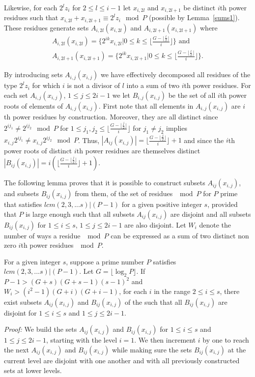 Likewise, for each $2^lz_i$ for $2 \leq l \leq i-1$ let $x_{i,2l}$
and $x_{i,2l+1}$ be distinct $i$th power residues such that
$x_{i,2l} + x_{i,2l+1} \equiv 2^lz_i \mod P$ (possible by
Lemma~\ref{sums1}). These residues generate sets
$A_{i,2l}(x_{i,2l})$ and  $A_{i,2l+1}(x_{i,2l+1})$ where
\begin{eqnarray}\label{azi2l}
A_{i,2l}(x_{i,2l}) =\{ 2^{ik}x_{i,2l}| 0 \leq k \leq \lfloor
\frac{G-\lfloor \frac{l}{2} \rfloor}{i} \rfloor \} \text{ and }\\
\label{azi2l}A_{i,2l+1}(x_{i,2l+1}) =\{ 2^{ik}x_{i,2l+1}| 0 \leq k
\leq \lfloor \frac{G-\lfloor \frac{l}{2} \rfloor}{i} \rfloor
\}.\end{eqnarray}

By introducing sets $A_{i,j}(x_{i,j})$ we have effectively
decomposed all residues of the type $2^lz_i$ for which $i$ is not
a divisor of $l$ into a sum of two $i$th power residues. For each
set $A_{i,j}(x_{i,j})$, $1 \leq j \leq 2i-1$ we let
$B_{i,j}(x_{i,j})$ be the set of all $i$th power roots of elements
of $A_{i,j}(x_{i,j})$. First note that all elements in
$A_{i,j}(x_{i,j})$ are $i$th power residues by construction.
Moreover, they are all distinct since  $2^{ij_1} \neq 2^{ij_2}
\mod P$ for $1 \leq j_1,j_2 \leq \lfloor
\frac{G-\lfloor\frac{j}{2} \rfloor}{i} \rfloor$ for $j_1\neq j_2$
implies $x_{i,j}2^{ij_1} \neq x_{i,j}2^{ij_2} \mod P$. Thus,
$|A_{ij}(x_{i,j})|=\lfloor \frac{G-\lfloor \frac{j}{2}\rfloor}{i}
\rfloor+1$ and since the $i$th power roots of distinct $i$th power
residues are themselves distinct $|B_{ij}(x_{i,j})|=i\left(\lfloor
\frac{G-\lfloor \frac{j}{2}\rfloor}{i} \rfloor+1\right)$.



The following lemma proves that it is possible to construct
subsets $A_{ij}(x_{i,j})$, and subsets $B_{ij}(x_{i,j})$ from
them, of the set of residues $\mod P$ for $P$ prime that satisfies
$lcm(2,3,...s) | (P-1)$ for a given positive integer $s$, provided
that $P$ is large enough such that all subsets $A_{ij}(x_{i,j})$
are disjoint and all subsets $B_{ij}(x_{i,j})$ for $1 \leq i \leq
s$, $1 \leq j \leq 2i-1$ are also disjoint. Let $W_i$ denote the
number of ways a residue $\mod P$ can be expressed as a sum of two
distinct non zero $i$th power residues $\mod P$.
\begin{lemma}\label{lemmaw} For a given integer $s$, suppose a prime number $P$ satisfies $lcm(2,3,...s) |
(P-1)$. Let $G =\lfloor \log_2{P}\rfloor$. If $P-1 >
(G+s)(G+s-1)(s-1)^2$ and $W_i
> (i^2-1)(G+i)(G+i-1)$, for each $i$ in the range $2 \leq i \leq
s$, there exist subsets $A_{ij}(x_{i,j})$ and $B_{ij}(x_{i,j})$ of
the
 such that all $B_{ij}(x_{i,j})$ are disjoint for $1 \leq i \leq
s$ and $1 \leq j \leq 2i-1$.
\end{lemma}
\noindent \textit{Proof:} We build the sets $A_{ij}(x_{i,j})$ and
$B_{ij}(x_{i,j})$ for $1 \leq i \leq s$ and $1 \leq j \leq 2i-1$,
starting with the level $i=1$. We then increment $i$ by one to
reach the next $A_{ij}(x_{i,j})$ and $B_{ij}(x_{i,j})$ while
making sure the sets $B_{ij}(x_{i,j})$ at the current level are
disjoint with one another and with all previously constructed sets
at lower levels.

